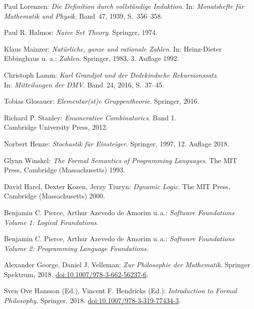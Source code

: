 \begin{thebibliography}{00}
 Paul Lorenzen:
\emph{Die Definition durch vollständige Induktion}.
In: \emph{Monatshefte für Mathematik und Physik}.
Band~47, 1939, S.~356--358.

 Paul R. Halmos:
\emph{Naive Set Theory}. Springer, 1974.

 Klaus Mainzer:
\emph{Natürliche, ganze und rationale Zahlen}.
In: Heinz-Dieter Ebbinghaus u. a.: \emph{Zahlen}.
Springer, 1983, 3. Auflage 1992.

 Christoph Lamm:
\emph{Karl Grandjot und der Dedekindsche Rekursionssatz}.\\
In: \emph{Mitteilungen der DMV}. Band~24, 2016, S.~37--45.

 Tobias Glosauer:
\emph{Elementar(st)e Gruppentheorie}.
Springer, 2016.

 Richard P. Stanley:
\emph{Enumerative Combinatorics}. Band 1.\\
Cambridge University Press, 2012.

 Norbert Henze: \emph{Stochastik für Einsteiger}.
Springer, 1997, 12. Auflage 2018.

 Glynn Winskel:
\emph{The Formal Semantics of Programming Languages}.
The MIT Press, Cambridge (Massachusetts) 1993.

 David Harel, Dexter Kozen, Jerzy Tiuryn:
\emph{Dynamic Logic}.
The MIT Press, Cambridge (Massachusetts) 2000.

 Benjamin C. Pierce, Arthur Azevedo de Amorim u.\,a.:
\emph{Software Foundations Volume 1: Logical Foundations}.

 Benjamin C. Pierce, Arthur Azevedo de Amorim u.\,a.:
\emph{Software Foundations Volume 2: Programming Language Foundations}.

 Alexander George, Daniel J. Velleman:
\emph{Zur Philosophie der Mathematik}. Springer Spektrum,
2018. \href{https://doi.org/10.1007/978-3-662-56237-6}{doi:10.1007/978-3-662-56237-6}.

 Sven Ove Hansson (Ed.), Vincent F. Hendricks (Ed.):
\emph{Introduction to Formal Philosophy}. Springer, 2018.
\href{https://doi.org/10.1007/978-3-319-77434-3}{doi:10.1007/978-3-319-77434-3}.

\end{thebibliography}

